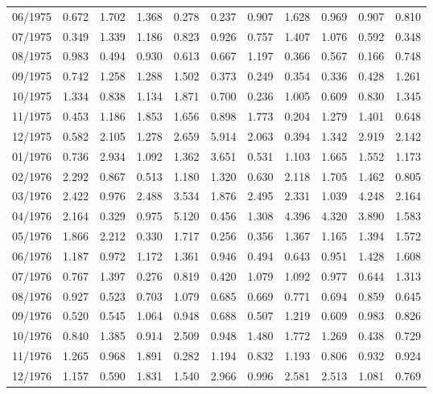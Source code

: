 \begin{tabular}{lrrrrrrrrrr}
06/1975 &  0.672 &  1.702 &  1.368 &  0.278 &  0.237 &  0.907 &  1.628 &  0.969 &  0.907 &  0.810 \\
07/1975 &  0.349 &  1.339 &  1.186 &  0.823 &  0.926 &  0.757 &  1.407 &  1.076 &  0.592 &  0.348 \\
08/1975 &  0.983 &  0.494 &  0.930 &  0.613 &  0.667 &  1.197 &  0.366 &  0.567 &  0.166 &  0.748 \\
09/1975 &  0.742 &  1.258 &  1.288 &  1.502 &  0.373 &  0.249 &  0.354 &  0.336 &  0.428 &  1.261 \\
10/1975 &  1.334 &  0.838 &  1.134 &  1.871 &  0.700 &  0.236 &  1.005 &  0.609 &  0.830 &  1.345 \\
11/1975 &  0.453 &  1.186 &  1.853 &  1.656 &  0.898 &  1.773 &  0.204 &  1.279 &  1.401 &  0.648 \\
12/1975 &  0.582 &  2.105 &  1.278 &  2.659 &  5.914 &  2.063 &  0.394 &  1.342 &  2.919 &  2.142 \\
01/1976 &  0.736 &  2.934 &  1.092 &  1.362 &  3.651 &  0.531 &  1.103 &  1.665 &  1.552 &  1.173 \\
02/1976 &  2.292 &  0.867 &  0.513 &  1.180 &  1.320 &  0.630 &  2.118 &  1.705 &  1.462 &  0.805 \\
03/1976 &  2.422 &  0.976 &  2.488 &  3.534 &  1.876 &  2.495 &  2.331 &  1.039 &  4.248 &  2.164 \\
04/1976 &  2.164 &  0.329 &  0.975 &  5.120 &  0.456 &  1.308 &  4.396 &  4.320 &  3.890 &  1.583 \\
05/1976 &  1.866 &  2.212 &  0.330 &  1.717 &  0.256 &  0.356 &  1.367 &  1.165 &  1.394 &  1.572 \\
06/1976 &  1.187 &  0.972 &  1.172 &  1.361 &  0.946 &  0.494 &  0.643 &  0.951 &  1.428 &  1.608 \\
07/1976 &  0.767 &  1.397 &  0.276 &  0.819 &  0.420 &  1.079 &  1.092 &  0.977 &  0.644 &  1.313 \\
08/1976 &  0.927 &  0.523 &  0.703 &  1.079 &  0.685 &  0.669 &  0.771 &  0.694 &  0.859 &  0.645 \\
09/1976 &  0.520 &  0.545 &  1.064 &  0.948 &  0.688 &  0.507 &  1.219 &  0.609 &  0.983 &  0.826 \\
10/1976 &  0.840 &  1.385 &  0.914 &  2.509 &  0.948 &  1.480 &  1.772 &  1.269 &  0.438 &  0.729 \\
11/1976 &  1.265 &  0.968 &  1.891 &  0.282 &  1.194 &  0.832 &  1.193 &  0.806 &  0.932 &  0.924 \\
12/1976 &  1.157 &  0.590 &  1.831 &  1.540 &  2.966 &  0.996 &  2.581 &  2.513 &  1.081 &  0.769 \\

\end{tabular}
